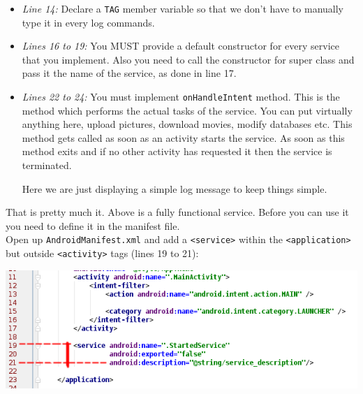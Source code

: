 \begin{itemize}
	\item \textit{Line 14:} Declare a \texttt{TAG} member variable so that we don't have to manually type it in every log commands.

	\item \textit{Lines 16 to 19:} You MUST provide a default constructor for every service that you implement. Also you need to call the constructor for super class and pass it the name of the service, as done in line 17.

	\item \textit{Lines 22 to 24:} You must implement \texttt{onHandleIntent} method. This is the method which performs the actual tasks of the service. You can put virtually anything here, upload pictures, download movies, modify databases etc. This method gets called as soon as an activity starts the service. As soon as this method exits and if no other activity has requested it then the service is terminated. 
	
	Here we are just displaying a simple log message to keep things simple.

\end{itemize}

That is pretty much it. Above is a fully functional service. Before you can use it you need to define it in the manifest file. \\

Open up \texttt{AndroidManifest.xml} and add a \texttt{<service>} within the \texttt{<application>} but outside \texttt{<activity>} tags (lines 19 to 21):

\begin{center}
	\includegraphics[scale=\SourceCodeScale]{chapters/ch14/images/5}
\end{center}

